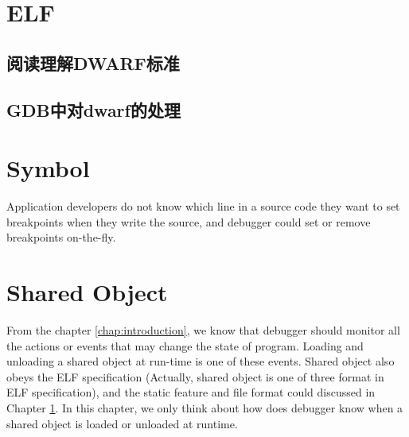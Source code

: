 \documentclass[12pt]{book}
\begin{document}
\begin{CJK}{UTF8}{gbsn}
\chapter{ELF}
\label{chap:elf}



\section{阅读理解DWARF标准}
\section{GDB中对dwarf的处理}


 
\chapter{Symbol}
\label{chap:symbol}
Application developers do not know which line in a source code they want to set breakpoints when
they write the source, and debugger could set or remove breakpoints on-the-fly.


\chapter{Shared Object}
\label{chap:sharedobject}
From the chapter \ref{chap:introduction}, we know that debugger should monitor all the 
actions or events that may change the state of program.
Loading and unloading a shared object at run-time is one of these events.
Shared object also obeys the ELF specification \cite{Manual:ELF}(Actually, shared object
is one of three format in ELF specification), and the
static feature and file format could discussed in Chapter \ref{chap:elf}.  
In this chapter, we only think about how does debugger know when a
shared object is loaded or unloaded at runtime.


\end{CJK}
\end{document}
